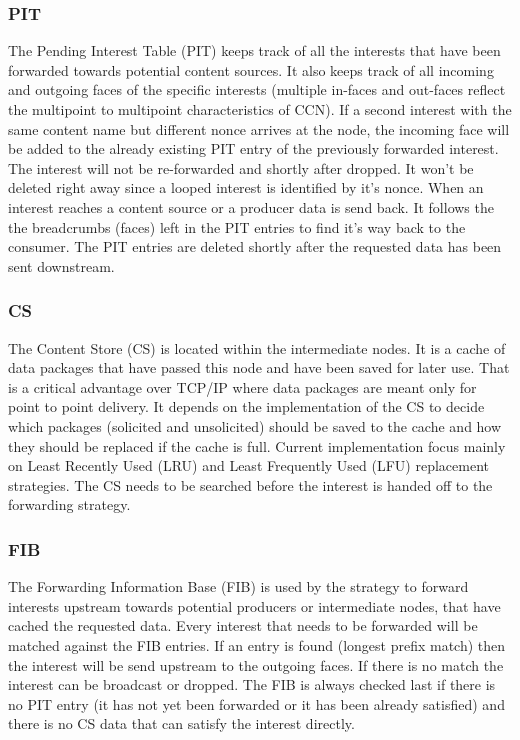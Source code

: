 \subsubsection{PIT}

The Pending Interest Table (PIT) keeps track of all the interests that have been forwarded towards potential content sources. It also keeps track of all incoming and outgoing faces of the specific interests (multiple in-faces and out-faces reflect the multipoint to multipoint characteristics of CCN). If a second interest with the same content name but different nonce arrives at the node, the incoming face will be added to the already existing PIT entry of the previously forwarded interest. The interest will not be re-forwarded and shortly after dropped. It won't be deleted right away since a looped interest is identified by it's nonce. When an interest reaches a content source or a producer data is send back. It follows the the breadcrumbs (faces) left in the PIT entries to find it's way back to the consumer. The PIT entries are deleted shortly after the requested data has been sent downstream.

\subsubsection{CS} 

The Content Store (CS) is located within the intermediate nodes. It is a cache of data packages that have passed this node and have been saved for later use. That is a critical advantage over TCP/IP where data packages are meant only for point to point delivery. It depends on the implementation of the CS to decide which packages (solicited and unsolicited) should be saved to the cache and how they should be replaced if the cache is full. Current implementation focus mainly on Least Recently Used (LRU) and Least Frequently Used (LFU) replacement strategies. The CS needs to be searched before the interest is handed off to the forwarding strategy.

\subsubsection{FIB}

The Forwarding Information Base (FIB) is used by the strategy to forward interests upstream towards potential producers or intermediate nodes, that have cached the requested data. Every interest that needs to be forwarded will be matched against the FIB entries. If an entry is found (longest prefix match) then the interest will be send upstream to the outgoing faces. If there is no match the interest can be broadcast or dropped. The FIB is always checked last if there is no PIT entry (it has not yet been forwarded or it has been already satisfied) and there is no CS data that can satisfy the interest directly.

